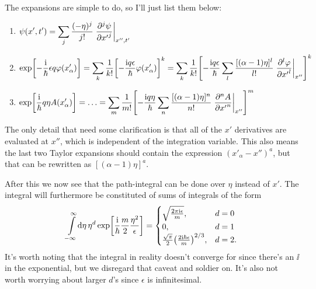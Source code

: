 \documentclass[11pt,letter, swedish, english
]{article}
\begin{document}
The expansions are simple to do, so I'll just list them below:
\begin{enumerate}[label=(\Roman*)]
\item $\displaystyle
\psi(x', t')=\sum_{j}  \frac{(-\eta)^j}{j!}\eval{\pdv[j]{\psi}{{x'}}}_{x'', t'}
$
\item $\displaystyle
\exp[-\frac{\ii}{\hbar}\epsilon q\varphi(x'_\alpha)]
=\sum_k \frac{1}{k!} 
\qty[-\frac{\ii q\epsilon}{\hbar} \varphi(x'_\alpha)]^k
=\sum_k \frac{1}{k!} 
\qty[-\frac{\ii q\epsilon}{\hbar} 
\sum_l \frac{[(\alpha-1)\eta]^l}{l!}\eval{\pdv[l]{\varphi}{{x'}}}_{x''}
]^k
$
\item $\displaystyle
\exp[\frac{\ii}{\hbar} q\eta A(x'_\alpha)]=\ldots
=\sum_m \frac{1}{m!} 
\qty[-\frac{\ii q\eta}{\hbar} 
\sum_n \frac{[(\alpha-1)\eta]^n}{n!}\eval{\pdv[n]{A}{{x'}}}_{x''}
]^m
$
\end{enumerate}
The only detail that need some clarification is that all of the $x'$
derivatives are evaluated at $x''$, which is independent of the
integration variable. This also means the last two Taylor expansions
should contain the expression $(x'_\alpha-x'')^a$, but that can be
rewritten as $[(\alpha-1)\eta]^a$.

After this we now see that the path-integral can be done over $\eta$
instead of $x'$.
The integral will furthermore be constituted of sums of integrals of
the form 
\begin{equation}\label{eq:4_int_form}
\int_{-\infty}^{\infty}\!\rd{\eta}\,\eta^d
\exp[\frac{\ii}{\hbar}\frac{m}{2}\frac{\eta^2}{\epsilon}]
=\begin{cases}
\sqrt{\frac{2\pi\ii\epsilon}{m}},&d=0\\
0,&d=1\\
\frac{\sqrt{\pi}}{2}\qty(\frac{2\ii\hbar\epsilon}{m})^{2/3},&d=2.
\end{cases}
\end{equation}
It's worth noting that the integral in reality doesn't converge for
since there's an $\ii$ in the exponential, but we disregard that
caveat and soldier on. It's also not worth worrying about larger $d$'s
since $\epsilon$ is infinitesimal. 
\end{document}
